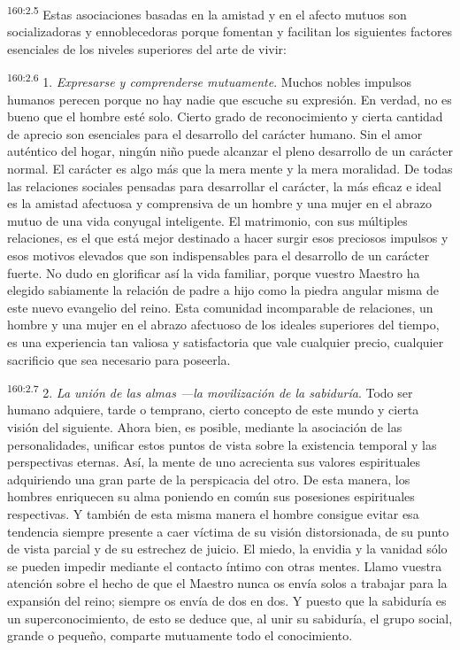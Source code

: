 \par 
\textsuperscript{160:2.5} Estas asociaciones basadas en la amistad y en el afecto mutuos son socializadoras y ennoblecedoras porque fomentan y facilitan los siguientes factores esenciales de los niveles superiores del arte de vivir:

\par 
\textsuperscript{160:2.6} 1. \textit{Expresarse y comprenderse mutuamente}. Muchos nobles impulsos humanos perecen porque no hay nadie que escuche su expresión. En verdad, no es bueno que el hombre esté solo. Cierto grado de reconocimiento y cierta cantidad de aprecio son esenciales para el desarrollo del carácter humano. Sin el amor auténtico del hogar, ningún niño puede alcanzar el pleno desarrollo de un carácter normal. El carácter es algo más que la mera mente y la mera moralidad. De todas las relaciones sociales pensadas para desarrollar el carácter, la más eficaz e ideal es la amistad afectuosa y comprensiva de un hombre y una mujer en el abrazo mutuo de una vida conyugal inteligente. El matrimonio, con sus múltiples relaciones, es el que está mejor destinado a hacer surgir esos preciosos impulsos y esos motivos elevados que son indispensables para el desarrollo de un carácter fuerte. No dudo en glorificar así la vida familiar, porque vuestro Maestro ha elegido sabiamente la relación de padre a hijo como la piedra angular misma de este nuevo evangelio del reino. Esta comunidad incomparable de relaciones, un hombre y una mujer en el abrazo afectuoso de los ideales superiores del tiempo, es una experiencia tan valiosa y satisfactoria que vale cualquier precio, cualquier sacrificio que sea necesario para poseerla.

\par 
\textsuperscript{160:2.7} 2. \textit{La unión de las almas ---la movilización de la sabiduría}. Todo ser humano adquiere, tarde o temprano, cierto concepto de este mundo y cierta visión del siguiente. Ahora bien, es posible, mediante la asociación de las personalidades, unificar estos puntos de vista sobre la existencia temporal y las perspectivas eternas. Así, la mente de uno acrecienta sus valores espirituales adquiriendo una gran parte de la perspicacia del otro. De esta manera, los hombres enriquecen su alma poniendo en común sus posesiones espirituales respectivas. Y también de esta misma manera el hombre consigue evitar esa tendencia siempre presente a caer víctima de su visión distorsionada, de su punto de vista parcial y de su estrechez de juicio. El miedo, la envidia y la vanidad sólo se pueden impedir mediante el contacto íntimo con otras mentes. Llamo vuestra atención sobre el hecho de que el Maestro nunca os envía solos a trabajar para la expansión del reino; siempre os envía de dos en dos. Y puesto que la sabiduría es un superconocimiento, de esto se deduce que, al unir su sabiduría, el grupo social, grande o pequeño, comparte mutuamente todo el conocimiento.

